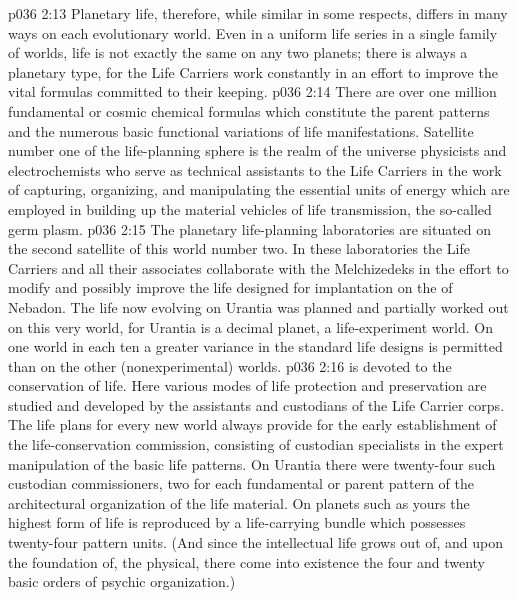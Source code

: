 \vs p036 2:13 Planetary life, therefore, while similar in some respects, differs in many ways on each evolutionary world. Even in a uniform life series in a single family of worlds, life is not exactly the same on any two planets; there is always a planetary type, for the Life Carriers work constantly in an effort to improve the vital formulas committed to their keeping.
\vs p036 2:14 There are over one million fundamental or cosmic chemical formulas which constitute the parent patterns and the numerous basic functional variations of life manifestations. Satellite number one of the life\hyp{}planning sphere is the realm of the universe physicists and electrochemists who serve as technical assistants to the Life Carriers in the work of capturing, organizing, and manipulating the essential units of energy which are employed in building up the material vehicles of life transmission, the so\hyp{}called germ plasm.
\vs p036 2:15 The planetary life\hyp{}planning laboratories are situated on the second satellite of this world number two. In these laboratories the Life Carriers and all their associates collaborate with the Melchizedeks in the effort to modify and possibly improve the life designed for implantation on the  of Nebadon. The life now evolving on Urantia was planned and partially worked out on this very world, for Urantia is a decimal planet, a life\hyp{}experiment world. On one world in each ten a greater variance in the standard life designs is permitted than on the other (nonexperimental) worlds.
\pc \vs p036 2:16  is devoted to the conservation of life. Here various modes of life protection and preservation are studied and developed by the assistants and custodians of the Life Carrier corps. The life plans for every new world always provide for the early establishment of the life\hyp{}conservation commission, consisting of custodian specialists in the expert manipulation of the basic life patterns. On Urantia there were twenty\hyp{}four such custodian commissioners, two for each fundamental or parent pattern of the architectural organization of the life material. On planets such as yours the highest form of life is reproduced by a life\hyp{}carrying bundle which possesses twenty\hyp{}four pattern units. (And since the intellectual life grows out of, and upon the foundation of, the physical, there come into existence the four and twenty basic orders of psychic organization.)
